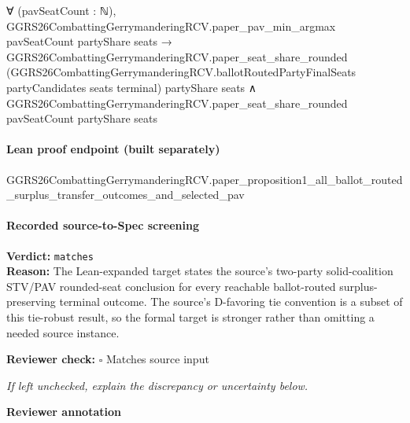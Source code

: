 \documentclass[10pt]{article}
\newcommand{\reviewerbox}{%
  \par\noindent\fbox{\parbox{0.96\linewidth}{\rule{0pt}{0.38in}}}\par
}
\newcommand{\reviewmatch}[1]{%
  \par\noindent\textbf{Reviewer check:} $\square$\; #1\par
  \noindent\emph{If left unchecked, explain the discrepancy or uncertainty below.}\par
}
\begin{document}
\begin{ReviewVerbatim}
                                        ∀ (pavSeatCount : ℕ),
                                          GGRS26CombattingGerrymanderingRCV.paper_pav_min_argmax pavSeatCount partyShare
                                              seats →
                                            GGRS26CombattingGerrymanderingRCV.paper_seat_share_rounded
                                                (GGRS26CombattingGerrymanderingRCV.ballotRoutedPartyFinalSeats
                                                  partyCandidates seats terminal)
                                                partyShare seats ∧
                                              GGRS26CombattingGerrymanderingRCV.paper_seat_share_rounded pavSeatCount
                                                partyShare seats
\end{ReviewVerbatim}

\paragraph{Lean proof endpoint (built separately)}\begin{ReviewVerbatim}
GGRS26CombattingGerrymanderingRCV.paper_proposition1_all_ballot_routed_surplus_transfer_outcomes_and_selected_pav
\end{ReviewVerbatim}

\paragraph{Recorded source-to-Spec screening}
\textbf{Verdict:} \texttt{matches}
\\
\textbf{Reason:} The Lean-expanded target states the source's two-party solid-coalition STV/PAV rounded-seat conclusion for every reachable ballot-routed surplus-preserving terminal outcome. The source's D-favoring tie convention is a subset of this tie-robust result, so the formal target is stronger rather than omitting a needed source instance.
\reviewmatch{Matches source input}
\noindent\textbf{Reviewer annotation}\par
\reviewerbox
\end{document}
